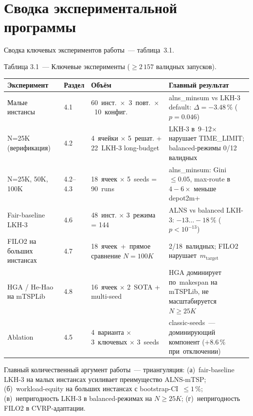 \documentclass[a4paper,14pt]{extreport}
\begin{document}
\section{Сводка экспериментальной программы}
\label{sec:experiment-summary}

Сводка ключевых экспериментов работы~--- таблица~3.1.

\medskip
\noindent Таблица 3.1~--- Ключевые эксперименты ($\geq 2\,157$ валидных запусков).

\begin{center}\small
\begin{tabular}{|L{3.0cm}|C{1.0cm}|L{3.5cm}|L{5.0cm}|}
\hline
\textbf{Эксперимент} & \textbf{Раздел} & \textbf{Объём} & \textbf{Главный результат} \\
\hline
Малые инстансы & 4.1 & 60~инст.~$\times$~3~повт.~$\times$~10~конфиг. & alns\_minsum vs LKH-3 default: $\Delta=-3.48\,\%$ ($p=0.046$) \\
\hline
N=25K (верификация) & 4.2 & 4~ячейки $\times$ 5~решат. + 22~LKH-3 long-budget & LKH-3 в~9--12$\times$ нарушает TIME\_LIMIT; balanced-режимы 0/12 валидных \\
\hline
N=25K, 50K, 100K & 4.2--4.3 & 18~ячеек $\times$ 5~seeds = 90~runs & alns\_minsum: Gini~$\leq 0.05$, max-route в~$4{-}6\times$ меньше depot2m+ \\
\hline
Fair-baseline LKH-3 & 4.6 & 48~инст. $\times$ 3~режима = 144 & ALNS vs balanced LKH-3: $-13\dots-18\,\%$ ($p<10^{-13}$) \\
\hline
FILO2 на больших инстансах & 4.7 & 18~ячеек~+~прямое сравнение $N=100K$ & 2/18~валидных; FILO2 нарушает~$m_\mathrm{target}$ \\
\hline
HGA / He-Hao на mTSPLib & 4.8 & 16~ячеек $\times$ 2~SOTA + multi-seed & HGA доминирует по~makespan на mTSPLib, не масштабируется $N\geq 25K$ \\
\hline
Ablation & 4.5 & 4~варианта $\times$ 3~ключевых $\times$ 3~seeds & classic-seeds~--- доминирующий компонент ($+8.6\,\%$ при~отключении) \\
\hline
\end{tabular}
\end{center}

\medskip
Главный количественный аргумент работы~--- триангуляция: (а)~fair-baseline LKH-3 на малых инстансах усиливает преимущество ALNS-mTSP; (б)~workload-equity на больших инстансах с bootstrap-CI~$\leq 1\,\%$; (в)~непригодность LKH-3 в balanced-режимах на $N\geq 25K$; (г)~непригодность FILO2 в CVRP-адаптации.
\end{document}
